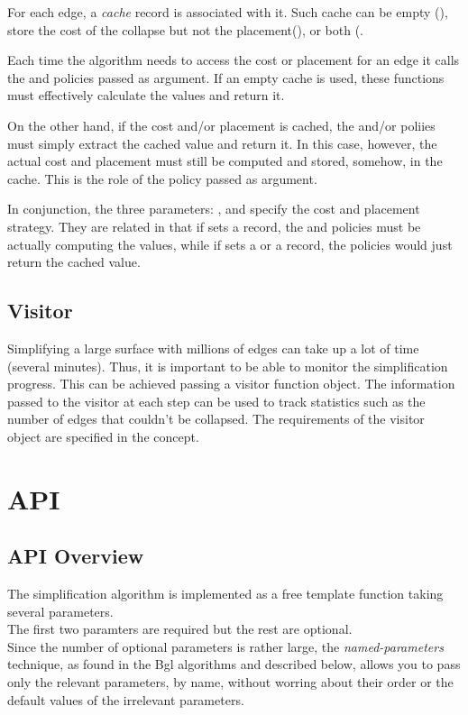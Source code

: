 For each edge, a {\em cache} record is associated with it. 
Such cache can be empty (), store the cost of the collapse but not the 
placement(), or both (.

Each time the algorithm needs to access the cost or placement for an edge
it calls the  and  policies passed 
as argument. If an empty cache is used, these functions must effectively
calculate the values and return it.

On the other hand, if the cost and/or placement is cached, the 
and/or  poliies must simply extract the cached value and return it. 
In this case, however, the actual cost and placement must still be computed and stored,
somehow, in the cache.
This is the role of the  policy passed as argument.

In conjunction, the three parameters: ,  and  
specify the cost and placement strategy. They are related in that if 
sets a  record, the  and  policies must be actually
computing the values, while if  sets a  or a 
record, the policies would just return the cached value.

\subsection{Visitor}

Simplifying a large surface with millions of edges can take up a lot of time (several minutes). Thus, it is important to be able to monitor the simplification progress. This can be achieved passing a visitor function object. The information passed to the visitor at each step can be used to track statistics such as the number of edges that couldn't be collapsed. The requirements of the visitor object are specified in the  concept.

\section{API}

\subsection{API Overview}

The simplification algorithm is implemented as a free template function taking several parameters.\\
The first two paramters are required but the rest are optional.\\
Since the number of optional parameters is rather large, the {\em named-parameters} technique, 
as found in the {\sc Bgl} 
algorithms and described below, allows you to pass only the relevant parameters, by name, 
without worring about their order or the default values of the irrelevant parameters.

